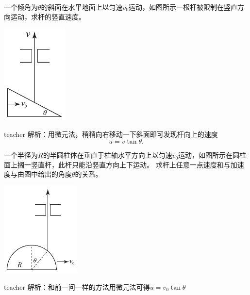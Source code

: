 \begin{example}
一个倾角为$\theta$的斜面在水平地面上以匀速$v_0$运动，如图所示一根杆被限制在竖直方向运动，求杆的竖直速度。
\begin{flushright}
\includegraphics[width = 0.25\textwidth]{images/motion-43.pdf} 
\end{flushright}
\begin{taggedblock}{teacher}
\noindent
解析：用微元法，稍稍向右移动一下斜面即可发现杆向上的速度
\[u = v\tan\theta.\]
\end{taggedblock}
\end{example}

\begin{example}
一个半径为$R$的半圆柱体在垂直于柱轴水平方向上以匀速$v_0$运动，如图所示在圆柱面上搁一竖直杆，此杆只能沿竖直方向上下运动。
求杆上任意一点速度和与加速度与由图中给出的角度$\theta$的关系。
\begin{flushright}
\includegraphics[width = 0.3\textwidth]{images/motion-44.pdf} 
\end{flushright}
\begin{taggedblock}{teacher}
\noindent
解析：和前一问一样的方法用微元法可得$u = v_0\tan\theta$
\end{taggedblock}
\end{example}

